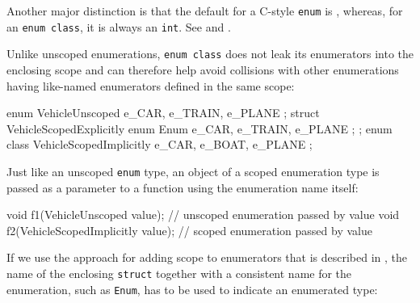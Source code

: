 \noindent Another major distinction is that the default
 for a C-style \lstinline!enum! is
, whereas, for an
\lstinline!enum!~\lstinline!class!, it is always an \lstinline!int!. See  and .

%

\noindent Unlike unscoped enumerations, \lstinline!enum!~\lstinline!class! does not leak
its enumerators into the enclosing scope and can therefore help avoid
collisions with other enumerations having like-named enumerators defined
in the same scope:

\begin{emcppslisting}[emcppsbatch=e3]
enum       VehicleUnscoped  { e_CAR, e_TRAIN, e_PLANE };
struct     VehicleScopedExplicitly { enum Enum { e_CAR, e_TRAIN, e_PLANE }; };
enum class VehicleScopedImplicitly { e_CAR, e_BOAT, e_PLANE };
\end{emcppslisting}

\noindent Just like an unscoped \lstinline!enum! type, an object of a scoped enumeration type is passed as a parameter to a function
using the enumeration name itself:

\begin{emcppslisting}[emcppsbatch=e3]
void f1(VehicleUnscoped value);          // unscoped enumeration passed by value
void f2(VehicleScopedImplicitly value);  // scoped enumeration passed by value
\end{emcppslisting}

If we use the approach for
adding scope to enumerators that is described in ,
the name of the enclosing \lstinline!struct! together with a
consistent name for the enumeration, such as \lstinline!Enum!, has to be used to indicate an
enumerated type:

